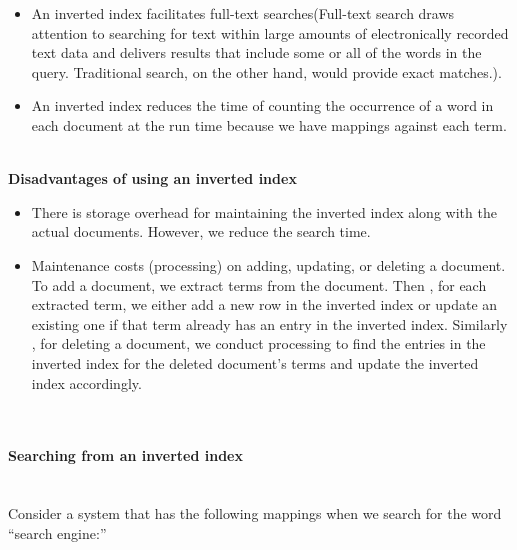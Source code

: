 \begin{itemize}
\item
\protect{}\label{uedbksLZhxRRqAAKxPcQ8}
An inverted index facilitates full-text searches(Full-text search draws attention to searching for text within large amounts of electronically recorded text data and delivers results that include some or all of the words in the query. Traditional search, on the other hand, would provide exact matches.).
\item
\protect{}\label{DHkuEtlHgFUG4pfBnVu1K}
An inverted index reduces the time of counting the occurrence of a word in each document at the run time because we have mappings against each term.
\end{itemize}
\\
\textbf{Disadvantages of using an inverted index}

\begin{itemize}
\item
\protect{}\label{H3APxMeLM-XlEE32ptri1}
There is storage overhead for maintaining the inverted index along with the actual documents. However, we reduce the search time.
\item
\protect{}\label{Cuamtulj2i92VnK4X_m4L}
Maintenance costs (processing) on adding, updating, or deleting a document. To add a document, we extract terms from the document. Then , for each extracted term, we either add a new row in the inverted index or update an existing one if that term already has an entry in the inverted index. Similarly
, for deleting a document, we conduct processing to find the entries in the inverted index for the deleted document's terms and update the inverted index accordingly.
\end{itemize}
\\
\paragraph{Searching from an inverted index}\label{L9__8c84xpuGJg3sAHRW1}
\\
Consider a system that has the following mappings when we search for the word ``search engine:''

\begin{table}[htbp]
\centering
\small
{}
\end{table}

